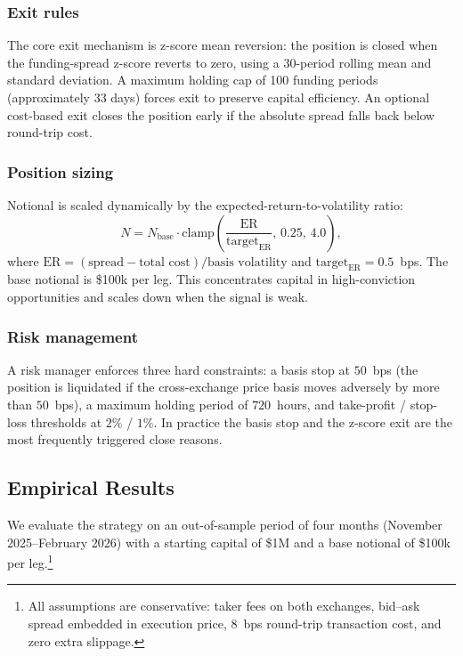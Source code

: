 \documentclass[10pt,twocolumn,a4paper]{article}
\begin{document}
\subsubsection{Exit rules}

The core exit mechanism is z-score mean reversion: the position is closed
when the funding-spread z-score reverts to zero, using a 30-period rolling
mean and standard deviation.  A maximum holding cap of 100 funding periods
(approximately 33 days) forces exit to preserve capital efficiency.  An
optional cost-based exit closes the position early if the absolute spread
falls back below round-trip cost.

\subsubsection{Position sizing}

Notional is scaled dynamically by the expected-return-to-volatility ratio:
\begin{equation}
  N = N_{\text{base}}\cdot
      \text{clamp}\!\left(\frac{\mathrm{ER}}{\text{target}_{\mathrm{ER}}},
      \,0.25,\,4.0\right),
  \label{eq:s1-sizing}
\end{equation}
where $\mathrm{ER} = (\text{spread} - \text{total cost})/\text{basis
volatility}$ and $\text{target}_{\mathrm{ER}} = 0.5$~bps.  The base
notional is \$100k per leg.  This concentrates capital in high-conviction
opportunities and scales down when the signal is weak.

\subsubsection{Risk management}

A risk manager enforces three hard constraints: a basis stop at $50$~bps
(the position is liquidated if the cross-exchange price basis moves
adversely by more than $50$~bps), a maximum holding period of $720$~hours,
and take-profit / stop-loss thresholds at $2\%$ / $1\%$.  In practice the
basis stop and the z-score exit are the most frequently triggered close
reasons.

\subsection{Empirical Results}

We evaluate the strategy on an out-of-sample period of four months
(November 2025--February 2026) with a starting capital of \$1M and a base
notional of \$100k per leg.\footnote{All assumptions are conservative:
taker fees on both exchanges, bid--ask spread embedded in execution price,
$8$~bps round-trip transaction cost, and zero extra slippage.}
\end{document}
